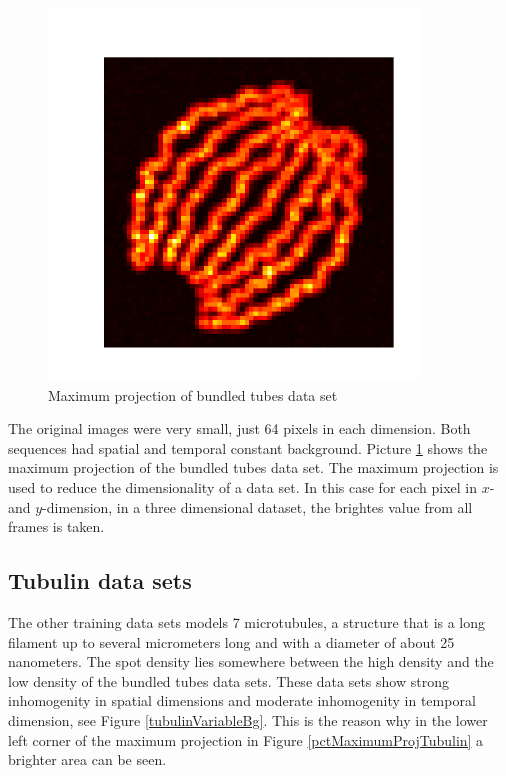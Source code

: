 \begin{figure}
\begin{minipage}[t]{0.33\textwidth}
\includegraphics[width = 0.88\textwidth]{pictures/maximumProjectionBundledTubesLSFarbig.png}
	\caption{Maximum projection of bundled tubes data set}
	\label{pctMaximumProjBundledTubes}

\end{minipage}
\end{figure}
The original images were very small, just 64 pixels in each dimension. Both sequences had spatial and temporal constant background. Picture \ref{pctMaximumProjBundledTubes} shows the maximum projection of the bundled tubes data set. The maximum projection is used to reduce the dimensionality of a data set. In this case for each pixel in $x$- and $y$-dimension, in a three dimensional dataset, the brightes value from all frames is taken. 


\subsection{Tubulin data sets}
The other training data sets models 7 microtubules, a structure that is a long filament up to several micrometers long and with a diameter of about 25 nanometers. The spot density lies somewhere between the high density and the low density of the bundled tubes data sets. These data sets show strong inhomogenity in spatial dimensions and moderate inhomogenity in temporal dimension, see Figure \ref{tubulinVariableBg}. This is the reason why in the lower left corner of the maximum projection in Figure \ref{pctMaximumProjTubulin} a brighter area can be seen.


